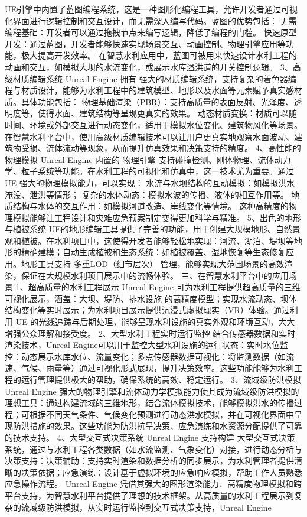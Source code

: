 UE引擎中内置了蓝图编程系统，这是一种图形化编程工具，允许开发者通过可视化界面进行逻辑控制和交互设计，而无需深入编写代码。蓝图的优势包括： 无需编程基础：开发者可以通过拖拽节点来编写逻辑，降低了编程的门槛。 快速原型开发：通过蓝图，开发者能够快速实现场景交互、动画控制、物理引擎应用等功能，极大提高开发效率。 在智慧水利应用中，蓝图可被用来快速设计水利工程的动画和交互，如模拟大坝的水流变化，或展示水库溢洪道的开关控制逻辑。 3、高级材质编辑系统 Unreal Engine 拥有 强大的材质编辑系统，支持复杂的着色器编程与材质设计，能够为水利工程中的建筑模型、地形以及水面等元素赋予真实感材质。具体功能包括： 物理基础渲染（PBR）：支持高质量的表面反射、光泽度、透明度等，使得水面、建筑结构等呈现更真实的效果。 动态材质变换：材质可以随时间、环境或外部交互进行动态变化，适用于模拟水位变化、建筑物风化等场景。 在智慧水利平台中，使用高级材质编辑技术可以让用户更真实地观察水面波动、建筑物受损、流体流动等现象，从而提升仿真效果和决策支持的精度。 4、高性能的物理模拟 Unreal Engine 内置的 物理引擎 支持碰撞检测、刚体物理、流体动力学、粒子系统等功能。在水利工程的可视化和仿真中，这一技术尤为重要。通过 UE 强大的物理模拟能力，可以实现： 水流与水坝结构的互动模拟：如模拟洪水淹没、泄洪等情形； 复杂的水体动态：模拟水波的传播、液体的相互作用等。 地质结构与水体的交互作用：如模拟河道改造、岸线变化等情境。 这种高精度的物理模拟能够让工程设计和灾难应急预案制定变得更加科学与精准。 5、出色的地形与植被系统 UE的地形编辑工具提供了完善的功能，用于创建大规模地形、自然景观和植被。在水利项目中，这使得开发者能够轻松地实现：河流、湖泊、堤坝等地形的精确建模；自动生成植被和生态系统：如植被覆盖、湿地恢复等生态修复应用。地形工具支持 多重LOD（细节层次） 管理，能够实现大范围场景的高效渲染，保证在大规模水利项目展示中的流畅体验。 三、在智慧水利平台中的应用场景 1、超高质量的水利工程展示 Unreal Engine 可为水利工程提供超高质量的三维可视化展示，涵盖：大坝、堤防、排水设施 的高精度模型；实现水流动态、坝体结构变化等实时展示；为水利项目展示提供沉浸式虚拟现实（VR）体验。通过利用 UE 的光线追踪与后期处理，能够呈现水利设施的真实外观和环境互动，大大增强公众理解和接受度。 2、大型水利工程实时运行监控 结合传感器数据和实时渲染技术，Unreal Engine可以用于监控大型水利设施的运行状态：实时水位监控：动态展示水库水位、流量变化；多点传感器数据可视化：将监测数据（如流速、气候、雨量等）通过可视化形式展现，提升决策效率。这些功能能够为水利工程的运行管理提供极大的帮助，确保系统的高效、稳定运行。 3、流域级防洪模拟 Unreal Engine 强大的物理引擎和流体动力学模拟能力使其成为流域级防洪模拟的理想工具：通过构建流域的三维地形，结合流体模拟技术，能够模拟洪水的传播过程；可根据不同天气条件、气候变化预测进行动态洪水模拟，并在可视化界面中呈现防洪措施的效果。这些功能为防洪抗旱决策、应急演练和水资源分配提供了可靠的技术支持。 4、大型交互式决策系统 Unreal Engine 支持构建 大型交互式决策系统，通过与水利工程各类数据（如水流监测、气象变化）对接，进行动态分析与决策支持：决策辅助：支持实时渲染和数据分析的同步展示，为水利管理者提供清晰的决策依据；应急演练：设计基于虚拟环境的应急响应模拟，帮助工作人员熟悉应急操作流程。 Unreal Engine 凭借其强大的图形渲染能力、高精度物理模拟和跨平台支持，为智慧水利平台提供了理想的技术框架。从高质量的水利工程展示到复杂的流域级防洪模拟，从实时运行监控到交互式决策支持，Unreal Engine 